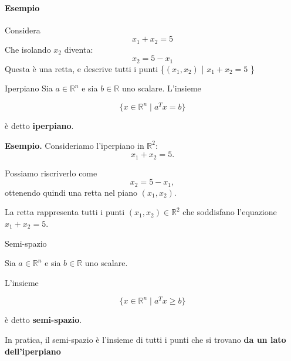 \paragraph{Esempio}
Considera 
\begin{equation}
    x_1 + x_2 = 5
\end{equation}
Che isolando $x_2$ diventa:
\begin{equation}
    x_2 = 5 - x_1
\end{equation}
Questa è una retta, e descrive tutti i punti \{$(x_1,x_2)$ | $x_1 + x_2 = 5$ \}

\begin{definition}{Iperpiano}
Sia $a \in \mathbb{R}^n$ e sia $b \in \mathbb{R}$ uno scalare.
L'insieme

$$
\{x \in \mathbb{R}^n \mid a^Tx = b\}
$$

è detto \textbf{iperpiano}.
\end{definition}

\textbf{Esempio.}
Consideriamo l'iperpiano in $\mathbb{R}^2$:
\[
x_1+x_2=5.
\]

Possiamo riscriverlo come
\[
x_2=5-x_1,
\]
ottenendo quindi una retta nel piano $(x_1,x_2)$.

\begin{center}
\end{center}

La retta rappresenta tutti i punti $(x_1,x_2)\in\mathbb{R}^2$
che soddisfano l'equazione $x_1+x_2=5$.


\begin{definition}{Semi-spazio}

Sia $a \in \mathbb{R}^n$ e sia $b \in \mathbb{R}$ uno scalare.

L'insieme

$$
\{x \in \mathbb{R}^n \mid a^Tx \geq b\}
$$

è detto \textbf{semi-spazio}.

\end{definition}

In pratica, il semi-spazio è l'insieme di tutti i punti che si trovano \textbf{da un lato dell'iperpiano}

